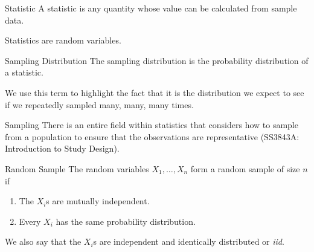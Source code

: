 \begin{frame}
  \begin{block}{Statistic}
    A statistic is any quantity whose value can be calculated from sample data.

    \pause

    \bigskip

    \begin{center}
      Statistics are random variables.
    \end{center}
  \end{block}
\end{frame}

\begin{frame}
  \begin{block}{Sampling Distribution}
    The sampling distribution is the probability distribution of a statistic.

    \bigskip
    
    \begin{center}
      We use this term to highlight the fact that it is the distribution we expect to see if we repeatedly sampled many, many, many times.
    \end{center}
  \end{block}
\end{frame}

\begin{frame}
  \begin{block}{Sampling}
  There is an entire field within statistics that considers how to sample from a population to ensure that the observations are representative (SS3843A: Introduction to Study Design).
  \end{block}
\end{frame}

\begin{frame}
  \begin{block}{Random Sample}
    The random variables $X_1,\ldots,X_n$ form a random sample of size $n$ if
    \begin{enumerate}
    \item The $X_i$s are mutually independent.
    \item Every $X_i$ has the same probability distribution.
    \end{enumerate}

    \bigskip
    We also say that the $X_i$s are independent and identically distributed or \textit{iid}.
  \end{block}
\end{frame}


